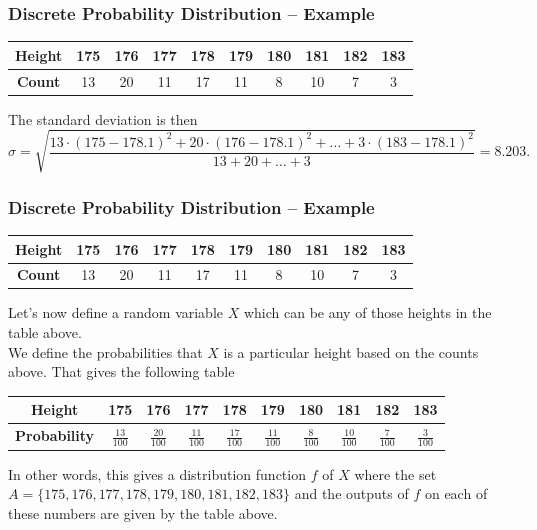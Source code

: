 \documentclass[aspectratio=169,11pt,usenames,dvipsnames]{beamer}
\begin{document}
\begin{frame}
 \frametitle{Discrete Probability Distribution -- Example}
  \begin{center}
  \begin{tabular}{c|ccccccccc}
   \textbf{Height} & 175 & 176 & 177 & 178 & 179 & 180 & 181 & 182 & 183\\
   \midrule
   \textbf{Count} & 13 & 20 & 11 & 17 & 11 & 8 & 10 & 7 & 3
  \end{tabular}
 \end{center}
 The standard deviation is then
 \[
  \sigma = \sqrt{\frac{13 \cdot (175 - 178.1)^2 + 20 \cdot (176 - 178.1)^2 +
  \ldots + 3 \cdot (183 - 178.1)^2}{13 + 20 + \ldots + 3}} = 8.203.
 \]
\end{frame}

\begin{frame}
 \frametitle{Discrete Probability Distribution -- Example}
  \begin{center}
  \begin{tabular}{c|ccccccccc}
   \textbf{Height} & 175 & 176 & 177 & 178 & 179 & 180 & 181 & 182 & 183\\
   \midrule
   \textbf{Count} & 13 & 20 & 11 & 17 & 11 & 8 & 10 & 7 & 3
  \end{tabular}
 \end{center}
 Let's now define a random variable $X$ which can be any of those heights in the
 table above. \\ \pause
 We define the probabilities that $X$ is a particular height based on the counts
 above. That gives the following table
 \begin{center}
  \begin{tabular}{c|ccccccccc}
   \textbf{Height} & 175 & 176 & 177 & 178 & 179 & 180 & 181 & 182 & 183\\
   \midrule
   \textbf{Probability} & $\frac{13}{100}$ & $\frac{20}{100}$ & $\frac{11}{100}$
                        & $\frac{17}{100}$ & $\frac{11}{100}$ & $\frac{8}{100}$
                        & $\frac{10}{100}$ & $\frac{7}{100}$ & $\frac{3}{100}$
  \end{tabular}
 \end{center}
 \pause
 In other words, this gives a \alert{distribution function} $f$ of $X$ where the
 set $A = \{175, 176, 177, 178, 179, 180, 181, 182, 183\}$ and the outputs of
 $f$ on each of these numbers are given by the table above.
\end{frame}
\end{document}
